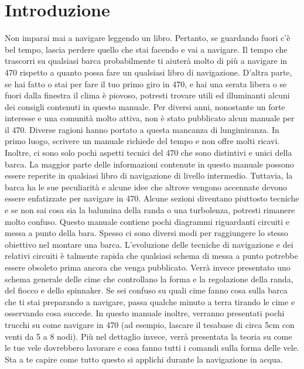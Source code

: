 
\chapter{Introduzione}
\label{ch:Introduzione}
Non imparai mai a navigare leggendo un libro. Pertanto, se guardando fuori c'è
bel tempo, lascia perdere quello che stai facendo e vai a navigare. Il tempo che
trascorri su qualsiasi barca probabilmente ti aiuterà molto di più a navigare in
470 rispetto a quanto possa fare un qualsiasi libro di
navigazione. D'altra parte, se hai fatto o stai per fare il tuo primo giro in
470, e hai una serata libera o se fuori dalla finestra il clima è piovoso, potresti trovare utili
ed illuminanti alcuni dei consigli contenuti in questo manuale.
Per diversi anni, nonostante un forte interesse e una comunità molto attiva, non
è stato pubblicato alcun manuale per il 470. Diverse ragioni hanno portato a
questa mancanza di lungimiranza. In primo luogo, scrivere un manuale richiede
del tempo e non offre molti ricavi. Inoltre, ci sono solo pochi aspetti tecnici
del 470 che sono distintivi e unici della barca. La maggior parte delle
informazioni contenute in questo manuale possono essere reperite in qualsiasi
libro di navigazione di livello intermedio. Tuttavia, la barca ha le sue
peculiarità e alcune idee che altrove vengono accennate devono essere
enfatizzate per navigare in 470. Alcune sezioni diventano piuttosto tecniche e
se non sai cosa sia la balumina della randa o una turbolenza, potresti rimanere molto
confuso. Questo manuale contiene pochi diagrammi riguardanti circuiti e messa a
punto della bara. Spesso ci sono diversi modi per raggiungere lo stesso
obiettivo nel montare una barca. L'evoluzione delle tecniche di navigazione e
dei relativi circuiti è talmente rapida che
qualsiasi schema di messa a punto potrebbe essere obsoleto prima ancora che
venga pubblicato. Verrà invece presentato uno schema generale delle cime che
controllano la forma e la regolazione della randa, del fiocco e dello spinnaker.
Se sei confuso su quali cime fanno cosa sulla barca che ti stai preparando a
navigare, passa qualche minuto a terra tirando le cime e osservando cosa
succede. In questo manuale inoltre, verranno presentati pochi trucchi su
come navigare in 470 (ad esempio, lascare il tesabase di circa 5cm con venti da 5
a 8 nodi). Più nel dettaglio invece, verrà presentata la teoria su come le tue vele dovrebbero
lavorare e cosa fanno tutti i comandi sulla forma delle vele. Sta a te capire
come tutto questo si applichi durante la navigazione in acqua.

